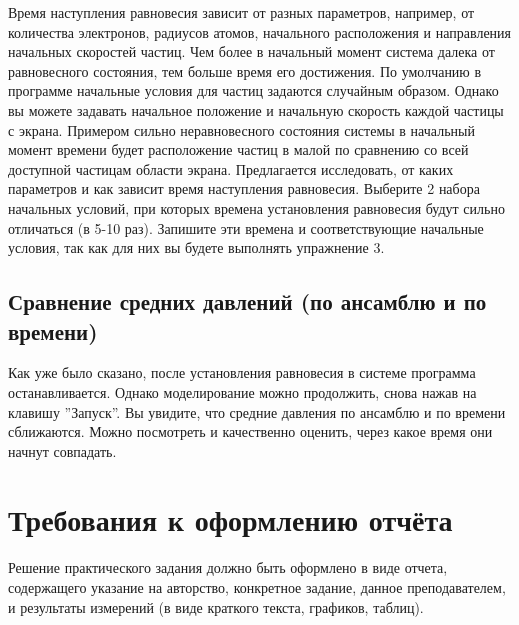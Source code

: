 \documentclass[12pt,a4paper]{scrartcl}
\begin{document}
	Время наступления равновесия зависит от разных параметров, например, от количества электронов, радиусов атомов, начального расположения и направления начальных скоростей частиц. Чем более в начальный момент система далека от равновесного состояния, тем больше время его достижения. По умолчанию в программе начальные условия для частиц задаются случайным образом. Однако вы можете задавать начальное положение и начальную скорость каждой частицы с экрана. Примером сильно неравновесного состояния системы в начальный момент времени будет расположение частиц в малой по сравнению со всей доступной частицам области экрана. Предлагается исследовать, от каких параметров и как зависит время наступления равновесия. Выберите 2 набора начальных условий, при которых времена установления равновесия будут сильно отличаться (в 5-10 раз). Запишите эти времена и соответствующие начальные условия, так как для них вы будете выполнять упражнение 3.
	
\subsection{Сравнение средних давлений (по ансамблю и по времени)}
	Как уже было сказано, после установления равновесия в системе программа останавливается. Однако моделирование можно продолжить, снова нажав на клавишу ''Запуск''. Вы увидите, что средние давления по ансамблю и по времени сближаются. Можно посмотреть и качественно оценить, через какое время они начнут совпадать.
	
    
\section{Требования к оформлению отчёта}
    Решение практического задания должно быть оформлено в виде отчета, содержащего указание на авторство, конкретное задание, данное преподавателем, и результаты измерений (в виде краткого текста, графиков, таблиц).
	

\end{document}

